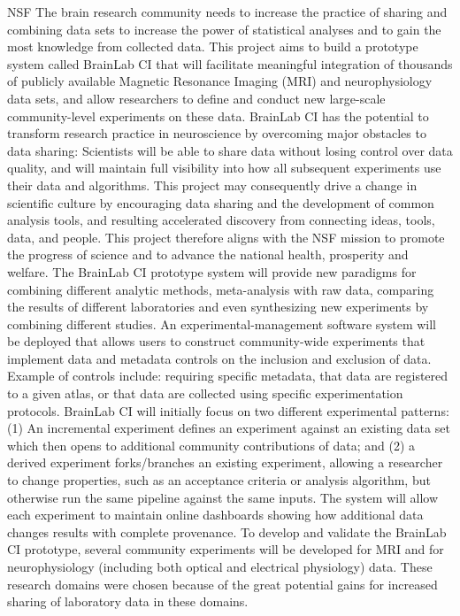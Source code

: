 \documentclass[10pt,colorlinks=true,urlcolor=blue]{moderncv}
\begin{document}
    {NSF}
    {
    The brain research community needs to increase the practice of sharing and combining data sets to increase the power of statistical analyses and to gain the most knowledge from collected data. This project aims to build a prototype system called BrainLab CI that will facilitate meaningful integration of thousands of publicly available Magnetic Resonance Imaging (MRI) and neurophysiology data sets, and allow researchers to define and conduct new large-scale community-level experiments on these data. BrainLab CI has the potential to transform research practice in neuroscience by overcoming major obstacles to data sharing: Scientists will be able to share data without losing control over data quality, and will maintain full visibility into how all subsequent experiments use their data and algorithms. This project may consequently drive a change in scientific culture by encouraging data sharing and the development of common analysis tools, and resulting accelerated discovery from connecting ideas, tools, data, and people. This project therefore aligns with the NSF mission to promote the progress of science and to advance the national health, prosperity and welfare.
%
The BrainLab CI prototype system will provide new paradigms for combining different analytic methods, meta-analysis with raw data, comparing the results of different laboratories and even synthesizing new experiments by combining different studies. An experimental-management software system will be deployed that allows users to construct community-wide experiments that implement data and metadata controls on the inclusion and exclusion of data. Example of controls include: requiring specific metadata, that data are registered to a given atlas, or that data are collected using specific experimentation protocols. BrainLab CI will initially focus on two different experimental patterns: (1) An incremental experiment defines an experiment against an existing data set which then opens to additional community contributions of data; and (2) a derived experiment forks/branches an existing experiment, allowing a researcher to change properties, such as an acceptance criteria or analysis algorithm, but otherwise run the same pipeline against the same inputs. The system will allow each experiment to maintain online dashboards showing how additional data changes results with complete provenance. To develop and validate the BrainLab CI prototype, several community experiments will be developed for MRI and for neurophysiology (including both optical and electrical physiology) data. These research domains were chosen because of the great potential gains for increased sharing of laboratory data in these domains.
}
\end{document}
